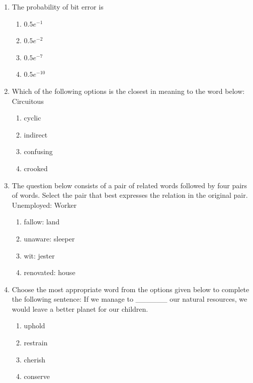 \documentclass[journal,12pt,onecolumn]{IEEEtran}
\begin{document}
\begin{enumerate}
\item The probability of bit error is
\begin{multicols}{2}
\begin{enumerate}
\item $0.5 e^{-1}$
\item $0.5 e^{-2}$
\item $0.5 e^{-7}$
\item $0.5 e^{-10}$
\end{enumerate}
\end{multicols}

\item Which of the following options is the closest in meaning to the word below: Circuitous
\begin{multicols}{2}
\begin{enumerate}
\item cyclic
\item indirect
\item confusing
\item crooked
\end{enumerate}
\end{multicols}

\item The question below consists of a pair of related words followed by four pairs of words. Select the pair that best expresses the relation in the original pair.\\
Unemployed: Worker
\begin{multicols}{2}
\begin{enumerate}
\item fallow: land
\item unaware: sleeper
\item wit: jester
\item renovated: house
\end{enumerate}
\end{multicols}

\item Choose the most appropriate word from the options given below to complete the following sentence: If we manage to \_\_\_\_\_\_ our natural resources, we would leave a better planet for our children.
\begin{multicols}{2}
\begin{enumerate}
\item uphold
\item restrain
\item cherish
\item conserve
\end{enumerate}
\end{multicols}


\end{enumerate}
\end{document}
